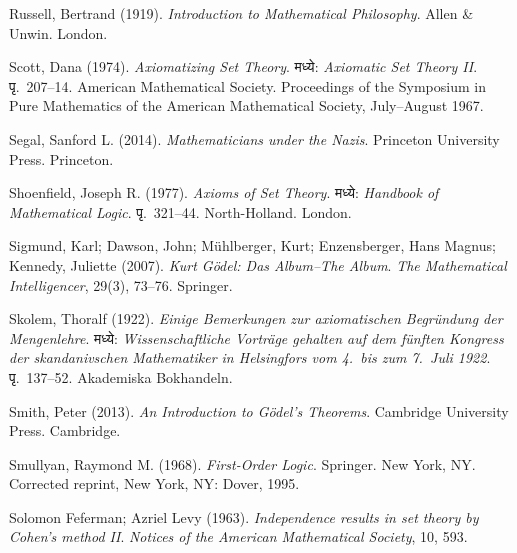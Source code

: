\par\medskip{}\label{bib:Russell1919}
Russell, Bertrand (1919). \emph{Introduction to Mathematical Philosophy}. Allen \& Unwin. London.

\par\medskip{}\label{bib:Scott1974}
Scott, Dana (1974). \emph{Axiomatizing Set Theory}. मध्ये: \emph{Axiomatic Set Theory II}. पृ.~207--14. American Mathematical Society. Proceedings of the Symposium in Pure Mathematics of the American Mathematical Society, July--August 1967.

\par\medskip{}\label{bib:Segal2014}
Segal, Sanford L. (2014). \emph{Mathematicians under the Nazis}. Princeton University Press. Princeton.

\par\medskip{}\label{bib:Shoenfield:AST}
Shoenfield, Joseph R. (1977). \emph{Axioms of Set Theory}. मध्ये: \emph{Handbook of Mathematical Logic}. पृ.~321--44. North-Holland. London.

\par\medskip{}\label{bib:Sigmund2007}
Sigmund, Karl; Dawson, John; M\"uhlberger, Kurt; Enzensberger, Hans Magnus; Kennedy, Juliette (2007). \emph{Kurt {G}\"odel: {D}as {A}lbum--{T}he {A}lbum}. \emph{The Mathematical Intelligencer}, 29(3), 73--76. Springer.

\par\medskip{}\label{bib:Skolem1922}
Skolem, Thoralf (1922). \emph{Einige {Bemerkungen} zur axiomatischen {Begr\"undung} der {Mengenlehre}}. मध्ये: \emph{Wissenschaftliche Vortr\"age gehalten auf dem f\"unften Kongress der skandanivschen Mathematiker in Helsingfors vom 4.\ bis zum 7.\ Juli 1922}. पृ.~137--52. Akademiska Bokhandeln.

\par\medskip{}\label{bib:Smith2013}
Smith, Peter (2013). \emph{An Introduction to G\"odel's Theorems}. Cambridge University Press. Cambridge.

\par\medskip{}\label{bib:Smullyan1968}
Smullyan, Raymond M. (1968). \emph{First-Order Logic}. Springer. New York, NY. Corrected reprint, New York, NY: Dover, 1995.

\par\medskip{}\label{bib:FefermanLevy1963}
Solomon {Feferman}; Azriel {Levy} (1963). \emph{Independence results in set theory by {Cohen}'s method {II}}. \emph{Notices of the American Mathematical Society}, 10, 593.


